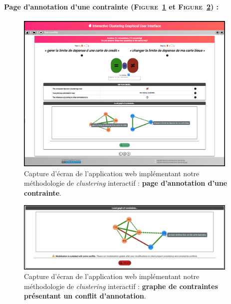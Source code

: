 	
	\newpage
	\paragraph{Page d'annotation d'une contrainte (\textsc{Figure~\ref{figure:C-WEB-APPLICATION-ANNOTATION}} et \textsc{Figure~\ref{figure:C-WEB-APPLICATION-CONFLIT}}) :}
	
		\begin{figure}[H]
			\centering
			\includegraphics[width=0.95\textwidth]{figures/interactive-clustering-application-annotation-0full}
			\caption{
				Capture d'écran de l'application web implémentant notre méthodologie de \textit{clustering} interactif : \textbf{page d'annotation d'une contrainte}.
			}
			\label{figure:C-WEB-APPLICATION-ANNOTATION}
		\end{figure}
		
		\begin{figure}[H]
			\centering
			\includegraphics[width=0.95\textwidth]{figures/interactive-clustering-application-annotation-4conflit}
			\caption{
				Capture d'écran de l'application web implémentant notre méthodologie de \textit{clustering} interactif : \textbf{graphe de contraintes présentant un conflit d'annotation}.
			}
			\label{figure:C-WEB-APPLICATION-CONFLIT}
		\end{figure}